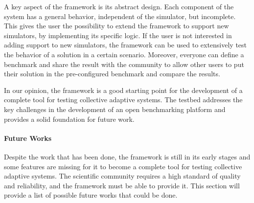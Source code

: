 \documentclass[12pt,a4paper,openright,twoside]{book}
\begin{document}
A key aspect of the framework is its abstract design. Each component of the system has a general behavior, independent of the simulator, but incomplete.
This gives the user the possibility to extend the framework to support new simulators, by implementing its specific logic.
If the user is not interested in adding support to new simulators, the framework can be used to extensively test the behavior of a solution in a certain scenario.
Moreover, everyone can define a benchmark and share the result with the community to allow other users to put their solution in the pre-configured benchmark and compare the results.

In our opinion, the framework is a good starting point for the development of a complete tool for testing collective adaptive systems.
The testbed addresses the key challenges in the development of an open benchmarking platform and provides a solid foundation for future work.

\paragraph*{Future Works}

Despite the work that has been done, the framework is still in its early stages and some features are missing for it to become a complete tool for testing collective adaptive systems.
The scientific community requires a high standard of quality and reliability, and the framework must be able to provide it.
This section will provide a list of possible future works that could be done.
\end{document}
